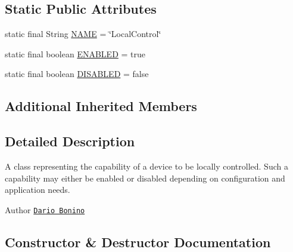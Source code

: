 \subsection*{Static Public Attributes}
\begin{DoxyCompactItemize}
\item 
static final String \hyperlink{classit_1_1polito_1_1elite_1_1enocean_1_1enj_1_1eep_1_1eep26_1_1attributes_1_1_e_e_p26_local_control_ae2c0ca54768891dbc547ebeb893e53b3}{N\+A\+ME} = \char`\"{}Local\+Control\char`\"{}
\item 
static final boolean \hyperlink{classit_1_1polito_1_1elite_1_1enocean_1_1enj_1_1eep_1_1eep26_1_1attributes_1_1_e_e_p26_local_control_abe554de0b011495a626b6f8d135893ee}{E\+N\+A\+B\+L\+ED} = true
\item 
static final boolean \hyperlink{classit_1_1polito_1_1elite_1_1enocean_1_1enj_1_1eep_1_1eep26_1_1attributes_1_1_e_e_p26_local_control_a887dd97270aeaf9940f389b1ac397a0b}{D\+I\+S\+A\+B\+L\+ED} = false
\end{DoxyCompactItemize}
\subsection*{Additional Inherited Members}


\subsection{Detailed Description}
A class representing the capability of a device to be locally controlled. Such a capability may either be enabled or disabled depending on configuration and application needs.

\begin{DoxyAuthor}{Author}
\href{mailto:dario.bonino@gmail.com}{\tt Dario Bonino} 
\end{DoxyAuthor}


\subsection{Constructor \& Destructor Documentation}
\hypertarget{classit_1_1polito_1_1elite_1_1enocean_1_1enj_1_1eep_1_1eep26_1_1attributes_1_1_e_e_p26_local_control_a8332d923ca708c6ef0e4a6226fb9b523}{}\label{classit_1_1polito_1_1elite_1_1enocean_1_1enj_1_1eep_1_1eep26_1_1attributes_1_1_e_e_p26_local_control_a8332d923ca708c6ef0e4a6226fb9b523} 
